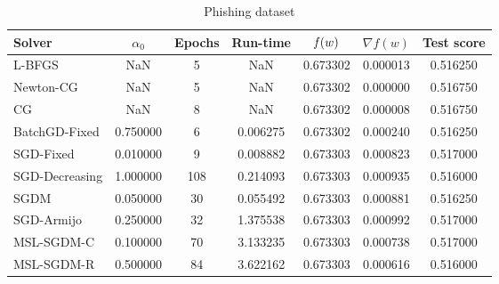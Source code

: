 \begin{table}
\caption{Phishing dataset}
\label{tab:phish-tab}
\centering
\begin{tabular}{lS[round-precision=3]S[drop-zero-decimal]S[round-precision=4]S[round-precision=6]S[exponent-mode=scientific]S[round-precision=6]}
\toprule
Solver & {$\alpha_0$} & {Epochs} & {Run-time} & {$\operatorname*{\mathit{f}}(w)$} & {$\nabla f(w)$} & {Test score} \\
\midrule
L-BFGS & NaN & 5 & NaN & 0.673302 & 0.000013 & 0.516250 \\
Newton-CG & NaN & 5 & NaN & 0.673302 & 0.000000 & 0.516750 \\
CG & NaN & 8 & NaN & 0.673302 & 0.000008 & 0.516750 \\
BatchGD-Fixed & 0.750000 & 6 & 0.006275 & 0.673302 & 0.000240 & 0.516250 \\
SGD-Fixed & 0.010000 & 9 & 0.008882 & 0.673303 & 0.000823 & 0.517000 \\
SGD-Decreasing & 1.000000 & 108 & 0.214093 & 0.673303 & 0.000935 & 0.516000 \\
SGDM & 0.050000 & 30 & 0.055492 & 0.673303 & 0.000881 & 0.516250 \\
SGD-Armijo & 0.250000 & 32 & 1.375538 & 0.673303 & 0.000992 & 0.517000 \\
MSL-SGDM-C & 0.100000 & 70 & 3.133235 & 0.673303 & 0.000738 & 0.517000 \\
MSL-SGDM-R & 0.500000 & 84 & 3.622162 & 0.673303 & 0.000616 & 0.516000 \\
\bottomrule
\end{tabular}
\end{table}

